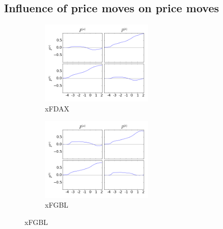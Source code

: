 \documentclass[a4paper,11pt]{article}
\begin{document}
\subsection{Influence of price moves on price moves}
\label{PP}
\begin{figure}[H]
        \begin{subfigure}[b]{0.45\textwidth}
                \includegraphics[width=\textwidth,height=40mm]{xFDAXPA_PB_TA_TB_LA_LB_CA_CB__PAPB-_PAPBcausality.png}
                \caption{xFDAX}
        \end{subfigure}
        \begin{subfigure}[b]{0.45\textwidth}
                \includegraphics[width=\textwidth,height=40mm]{xFGBLPA_PB_TA_TB_LA_LB_CA_CB__PAPB-_PAPBcausality.png}
                \caption{xFGBL}
        \end{subfigure}
\end{figure}
\end{document}
